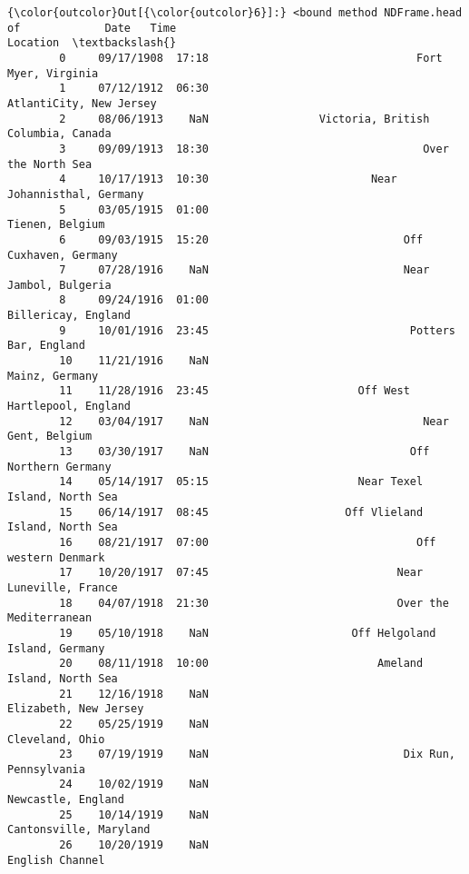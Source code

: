 \documentclass[11pt]{article}
\begin{document}
\begin{Verbatim}[commandchars=\\\{\}]
{\color{outcolor}Out[{\color{outcolor}6}]:} <bound method NDFrame.head of             Date   Time                                           Location  \textbackslash{}
        0     09/17/1908  17:18                                Fort Myer, Virginia   
        1     07/12/1912  06:30                            AtlantiCity, New Jersey   
        2     08/06/1913    NaN                 Victoria, British Columbia, Canada   
        3     09/09/1913  18:30                                 Over the North Sea   
        4     10/17/1913  10:30                         Near Johannisthal, Germany   
        5     03/05/1915  01:00                                    Tienen, Belgium   
        6     09/03/1915  15:20                              Off Cuxhaven, Germany   
        7     07/28/1916    NaN                              Near Jambol, Bulgeria   
        8     09/24/1916  01:00                                Billericay, England   
        9     10/01/1916  23:45                               Potters Bar, England   
        10    11/21/1916    NaN                                     Mainz, Germany   
        11    11/28/1916  23:45                       Off West Hartlepool, England   
        12    03/04/1917    NaN                                 Near Gent, Belgium   
        13    03/30/1917    NaN                               Off Northern Germany   
        14    05/14/1917  05:15                       Near Texel Island, North Sea   
        15    06/14/1917  08:45                     Off Vlieland Island, North Sea   
        16    08/21/1917  07:00                                Off western Denmark   
        17    10/20/1917  07:45                             Near Luneville, France   
        18    04/07/1918  21:30                             Over the Mediterranean   
        19    05/10/1918    NaN                      Off Helgoland Island, Germany   
        20    08/11/1918  10:00                          Ameland Island, North Sea   
        21    12/16/1918    NaN                              Elizabeth, New Jersey   
        22    05/25/1919    NaN                                    Cleveland, Ohio   
        23    07/19/1919    NaN                              Dix Run, Pennsylvania   
        24    10/02/1919    NaN                                 Newcastle, England   
        25    10/14/1919    NaN                             Cantonsville, Maryland   
        26    10/20/1919    NaN                                    English Channel   

\end{Verbatim}
\end{document}
